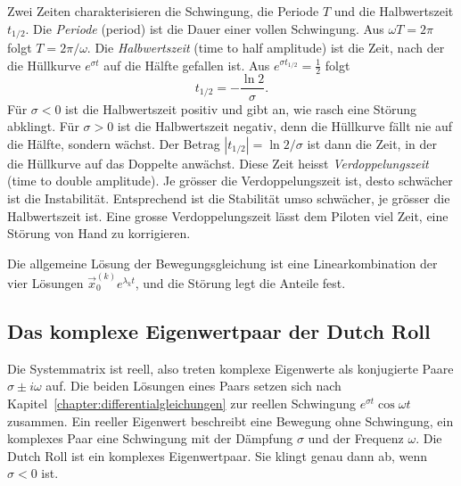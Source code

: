 Zwei Zeiten charakterisieren die Schwingung, die Periode $T$ und die
Halbwertszeit $t_{1/2}$.
Die \emph{Periode} (period) ist die Dauer einer vollen Schwingung.
%
Aus $\omega T = 2\pi$ folgt $T = 2\pi/\omega$.
Die \emph{Halbwertszeit} (time to half amplitude) ist die Zeit, nach der die
%
Hüllkurve $e^{\sigma t}$ auf die Hälfte gefallen ist.
Aus $e^{\sigma t_{1/2}} = \frac{1}{2}$ folgt
\begin{equation}
    t_{1/2}
    =
    -\frac{\ln 2}{\sigma}.
    \label{aircraft:eqn:halbwertszeit}
\end{equation}
Für $\sigma < 0$ ist die Halbwertszeit positiv und gibt an, wie rasch eine
Störung abklingt.
Für $\sigma > 0$ ist die Halbwertszeit negativ, denn die Hüllkurve fällt nie auf
die Hälfte, sondern wächst.
Der Betrag $|t_{1/2}| = \ln 2/\sigma$ ist dann die Zeit, in der die Hüllkurve
auf das Doppelte anwächst.
Diese Zeit heisst \emph{Verdoppelungszeit} (time to double amplitude).
%
Je grösser die Verdoppelungszeit ist, desto schwächer ist die Instabilität.
Entsprechend ist die Stabilität umso schwächer, je grösser die Halbwertszeit
ist.
Eine grosse Verdoppelungszeit lässt dem Piloten viel Zeit, eine Störung von
Hand zu korrigieren.

Die allgemeine Lösung der Bewegungsgleichung ist eine
Linearkombination der vier Lösungen $\vec{x}_0^{(k)} e^{\lambda_k t}$,
und die Störung legt die Anteile fest.

\subsection{Das komplexe Eigenwertpaar der Dutch Roll
\label{aircraft:subsection:eigenwertpaar}}
Die Systemmatrix ist reell, also treten komplexe Eigenwerte als
konjugierte Paare $\sigma \pm i\omega$ auf.
Die beiden Lösungen eines Paars setzen sich nach
Kapitel~\ref{chapter:differentialgleichungen} zur reellen Schwingung
$e^{\sigma t}\cos\omega t$ zusammen.
Ein reeller Eigenwert beschreibt eine Bewegung ohne Schwingung, ein
komplexes Paar eine Schwingung mit der Dämpfung $\sigma$ und der
Frequenz $\omega$.
Die Dutch Roll ist ein komplexes Eigenwertpaar.
Sie klingt genau dann ab, wenn $\sigma < 0$ ist.

